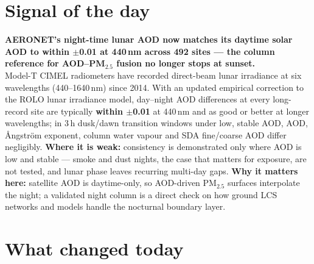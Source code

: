 \documentclass[10pt]{article}
\begin{document}
\vspace{6mm}

\section*{\sffamily\bfseries\color{Deep}Signal of the day}
\vspace{-1.5mm}{\color{Amber}\rule{\linewidth}{1.1pt}}\vspace{2.5mm}

\begin{keybox}
{\sffamily\bfseries\small\color{Deep}AERONET's night-time lunar AOD now matches its daytime solar
AOD to within $\pm$0.01 at 440\,nm across 492 sites --- the column reference for AOD--PM$_{2.5}$ fusion no
longer stops at sunset.}\\[1.4mm]
\footnotesize
Model-T CIMEL radiometers have recorded direct-beam lunar irradiance at six wavelengths (440--1640\,nm) since
2014. With an updated empirical correction to the ROLO lunar irradiance model, day--night AOD differences at
every long-record site are typically \textbf{within $\pm$0.01} at 440\,nm and as good or better at longer
wavelengths; in 3\,h dusk/dawn transition windows under low, stable AOD, AOD, \AA ngstr\"om exponent, column water
vapour and SDA fine/coarse AOD differ negligibly.
\textbf{Where it is weak:} consistency is demonstrated only where AOD is low and stable --- smoke and dust nights,
the case that matters for exposure, are not tested, and lunar phase leaves recurring multi-day gaps.
\textbf{Why it matters here:} satellite AOD is daytime-only, so AOD-driven PM$_{2.5}$ surfaces interpolate the
night; a validated night column is a direct check on how ground LCS networks and models handle the nocturnal
boundary layer.\par
\end{keybox}

\vspace{3mm}

\section*{\sffamily\bfseries\color{Deep}What changed today}
\vspace{-1.5mm}{\color{Amber}\rule{\linewidth}{1.1pt}}\vspace{2.5mm}
\end{document}
